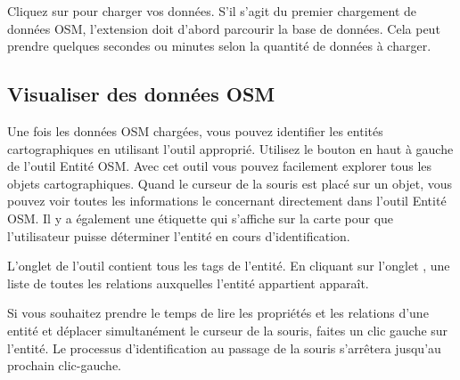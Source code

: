 Cliquez sur  pour charger vos données. S'il s'agit du premier chargement de données OSM, l'extension doit d'abord parcourir la base de données. Cela peut prendre quelques secondes ou minutes selon la quantité de données à charger.

\subsection{Visualiser des données OSM}

Une fois les données OSM chargées, vous pouvez identifier les entités cartographiques en utilisant l'outil approprié. Utilisez le bouton  en haut à gauche de l'outil Entité OSM. Avec cet outil vous pouvez facilement explorer tous les objets cartographiques. Quand le curseur de la souris est placé sur un objet, vous pouvez voir toutes les informations le concernant directement dans l'outil Entité OSM. Il y a également une étiquette qui s'affiche sur la carte pour que l'utilisateur puisse déterminer l'entité en cours d'identification.

L'onglet  de l'outil contient tous les tags de l'entité. En cliquant sur l'onglet , une liste de toutes les relations auxquelles l'entité appartient apparaît.

Si vous souhaitez prendre le temps de lire les propriétés et les relations d'une entité et déplacer simultanément le curseur de la souris, faites un clic gauche sur l'entité. Le processus d'identification au passage de la souris s'arrêtera jusqu'au prochain clic-gauche.

